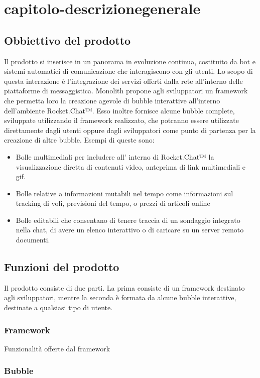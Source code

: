 \section{capitolo-descrizionegenerale}
\subsection{Obbiettivo del prodotto}
Il prodotto si inserisce in un panorama in evoluzione continua, costituito da bot e sistemi automatici di comunicazione che interagiscono con gli utenti.
Lo scopo di  questa interazione è l’integrazione dei servizi offerti dalla rete all’interno delle piattaforme di messaggistica. 
Monolith propone agli sviluppatori un framework che permetta loro la creazione agevole di bubble interattive all’interno dell’ambiente Rocket.Chat™.
Esso inoltre fornisce alcune bubble complete, sviluppate utilizzando il framework realizzato, che potranno essere utilizzate direttamente dagli utenti oppure dagli sviluppatori come punto di partenza per la creazione di altre bubble.
Esempi di queste sono: 
\begin{itemize}
	\item Bolle multimediali per includere all’ interno di  Rocket.Chat™ la visualizzazione diretta di contenuti video, anteprima di link multimediali e gif.
	\item Bolle relative a informazioni mutabili nel tempo come informazioni sul tracking di voli, previsioni del tempo, o prezzi di articoli online
	\item Bolle editabili che consentano di tenere traccia di un sondaggio integrato nella chat, di avere un elenco interattivo o di caricare su un server remoto documenti.
\end{itemize}

\subsection{Funzioni del prodotto}
Il prodotto consiste di due parti. La prima consiste di un framework destinato agli sviluppatori, mentre la seconda è formata da alcune bubble interattive, destinate a qualsiasi tipo di utente.
\subsubsection{Framework}
Funzionalità offerte dal framework
\subsubsection{Bubble}




